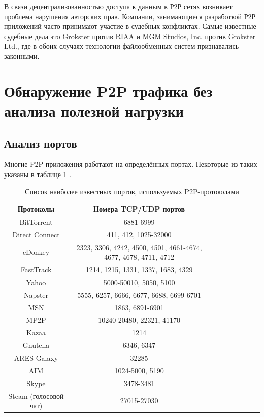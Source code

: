\documentclass[bachelor, och, coursework]{SCWorks}
\begin{document}
В связи децентрализованностью доступа к данным в Р2Р сетях возникает проблема нарушения авторских прав. 
Компании, занимающиеся разработкой Р2Р приложений часто принимают участие в судебных конфликтах. 
Самые известные судебные дела это Grokster против RIAA и MGM Studios, Inc. против Grokster Ltd., 
где в обоих случаях технологии файлообменных систем признавались законными.

\section{Обнаружение P2P трафика без анализа полезной нагрузки}
\subsection{Анализ портов}
Многие P2P-приложения работают на определённых портах. 
Некоторые из таких указаны в таблице \ref{table:p2p-ports} \cite{p2p-list}.

\begin{table}[H]
    \caption{Список наиболее известных портов, используемых P2P-протоколами}
    \label{table:p2p-ports}
    \begin{center}
    {\small
    \begin{tabular}{|c|c|c|c|c|c|c|c|c|}
        \hline
    Протоколы   & Номера TCP/UDP портов \\ \hline
    BitTorrent      & 6881-6999  \\ \hline
    Direct Connect  & 411, 412, 1025-32000  \\ \hline
    eDonkey         & 2323, 3306, 4242, 4500, 4501, 4661-4674, 4677, 4678, 4711, 4712  \\ \hline
    FastTrack       & 1214, 1215, 1331, 1337, 1683, 4329  \\ \hline
    Yahoo           & 5000-50010, 5050, 5100  \\ \hline
    Napster         & 5555, 6257, 6666, 6677, 6688, 6699-6701  \\ \hline
    MSN             & 1863, 6891-6901 \\ \hline
    MP2P            & 10240-20480, 22321, 41170  \\ \hline
    Kazaa           & 1214  \\ \hline
    Gnutella        & 6346, 6347  \\ \hline
    ARES Galaxy     & 32285  \\ \hline
    AIM             & 1024-5000, 5190  \\ \hline
    Skype           & 3478-3481 \\ \hline
    Steam (голосовой чат) & 27015-27030 \\ \hline
    \end{tabular}
    }
    \end{center}
\end{table}
\end{document}
